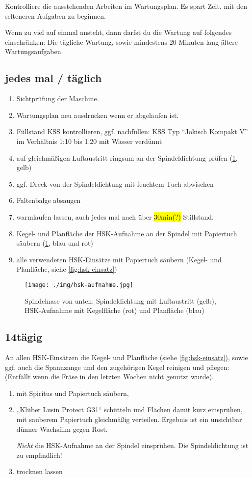 \documentclass{\basedir/fablab-document}
\renewcommand{\todo}[1]{\colorbox{yellow}{{#1}}}
\begin{document}
Kontrolliere die ausstehenden Arbeiten im Wartungsplan. Es spart Zeit, mit den selteneren Aufgaben zu beginnen.

Wenn zu viel auf einmal ansteht, dann darfst du die Wartung auf folgendes einschränken: Die tägliche Wartung, sowie mindestens 20 Minuten lang ältere Wartungsaufgaben.

\subsection{jedes mal / täglich}
\begin{enumerate}
	\item Sichtprüfung der Maschine.
	\item Wartungsplan neu ausdrucken wenn er abgelaufen ist.
	\item Füllstand KSS kontrollieren, ggf. nachfüllen: KSS Typ \enquote{Jokisch Kompakt V} im Verhältnis 1:10 bis 1:20 mit Wasser verdünnt
	\item auf gleichmäßigen Luftaustritt ringsum an der Spindeldichtung prüfen (\cref{fig:hsk-aufnahme}, gelb)
	\item ggf. Dreck von der Spindeldichtung mit feuchtem Tuch abwischen
	\item Faltenbalge absaugen
	\item warmlaufen lassen, auch jedes mal nach über \todo{30min(?)} Stillstand. %
	\item Kegel- und Planfläche der HSK-Aufnahme an der Spindel mit Papiertuch säubern (\cref{fig:hsk-aufnahme}, blau und rot)
	\item alle verwendeten HSK-Einsätze mit Papiertuch säubern (Kegel- und Planfläche, siehe \cref{fig:hsk-einsatz})
\end{enumerate}

\begin{figure}[hb!]
\centering
\texttt{[image: ./img/hsk-aufnahme.jpg]}
\caption{Spindelnase von unten: Spindeldichtung mit Luftaustritt (gelb), \\HSK-Aufnahme mit Kegelfläche (rot) und Planfläche (blau)}
\label{fig:hsk-aufnahme}
\end{figure}

\subsection{14tägig}
An allen HSK-Einsätzen die Kegel- und Planfläche (siehe \cref{fig:hsk-einsatz}), sowie ggf. auch die Spannzange und den zugehörigen Kegel reinigen und pflegen: (Entfällt wenn die Fräse in den letzten Wochen nicht genutzt wurde).
\begin{enumerate}
	\item mit Spiritus und Papiertuch säubern, 
	\item „Klüber Lusin Protect G31“ schütteln und Flächen damit kurz einsprühen, mit sauberem Papiertuch gleichmäßig verteilen. Ergebnis ist ein unsichtbar dünner Wachsfilm gegen Rost.
	
	\emph{Nicht} die HSK-Aufnahme an der Spindel einsprühen. Die Spindeldichtung ist zu empfindlich!
	\item trocknen lassen
\end{enumerate}
\end{document}

